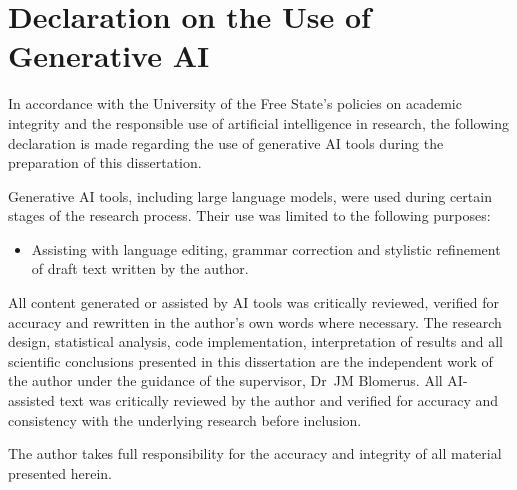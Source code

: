 {}

\section*{Declaration on the Use of Generative AI}

In accordance with the University of the Free State's policies on academic integrity and the responsible use of artificial intelligence in research, the following declaration is made regarding the use of generative AI tools during the preparation of this dissertation.

Generative AI tools, including large language models, were used during certain stages of the research process.
Their use was limited to the following purposes:

\begin{itemize}
    \item Assisting with language editing, grammar correction and stylistic refinement of draft text written by the author.
\end{itemize}

\noindent
All content generated or assisted by AI tools was critically reviewed, verified for accuracy and rewritten in the author's own words where necessary.
The research design, statistical analysis, code implementation, interpretation of results and all scientific conclusions presented in this dissertation are the independent work of the author under the guidance of the supervisor, Dr~JM Blomerus.
All AI-assisted text was critically reviewed by the author and verified for accuracy and consistency with the underlying research before inclusion.

The author takes full responsibility for the accuracy and integrity of all material presented herein.
